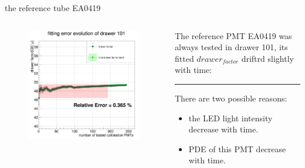 \documentclass[11pt,compress,xcolor=x11names,UTF8]{beamer}
\begin{document}
\begin{frame}{the reference tube EA0419}
\begin{columns}
\begin{column}{.5\textwidth}
\begin{figure}
\centering
\includegraphics[width=\textwidth]{lt101} %
\end{figure}
\end{column}
\begin{column}{.45\textwidth}
The reference PMT EA0419 was always tested in drawer 101, its fitted $drawer_{factor}$ driftrd slightly with time:
\vspace{.5cm}
\hrule{\textwidth}
\vspace{.5cm}
There are two possible reasons:
\begin{itemize}
\item the LED light intensity decrease with time.
\item PDE of this PMT decrease with time.
\end{itemize}

\end{column}
\end{columns}
\end{frame}
\end{document}
